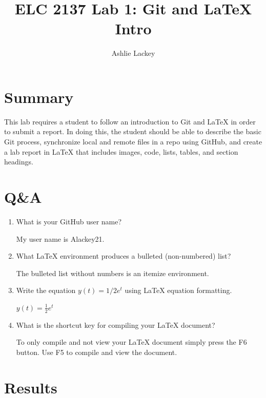 \documentclass[11pt]{article}
\begin{document}
\title{ELC 2137 Lab 1: Git and LaTeX Intro}
\author{Ashlie Lackey}

\maketitle


\section*{Summary}

This lab requires a student to follow an introduction to Git and LaTeX in order to submit a report. In doing this, the student should be able to describe the basic Git process, synchronize local and remote files in a repo using GitHub, and create a lab report in LaTeX that includes images, code, lists, tables, and section headings.   


\section*{Q\&A}

\begin{enumerate}
\item What is your GitHub user name?
	
	My user name is Alackey21.
\item  What LaTeX environment produces a bulleted (non-numbered) list?
	
	The bulleted list without numbers is an itemize environment.
\item  Write the equation $y(t) = 1/2 e^t$ using LaTeX equation formatting.
	
	$y(t) = \frac{1}{2} e^t$
\item What is the shortcut key for compiling your LaTeX document?

	
	To only compile and not view your LaTeX document simply press the F6 button. Use F5 to compile and view the document. 
\end{enumerate}

\section*{Results}
\end{document}
